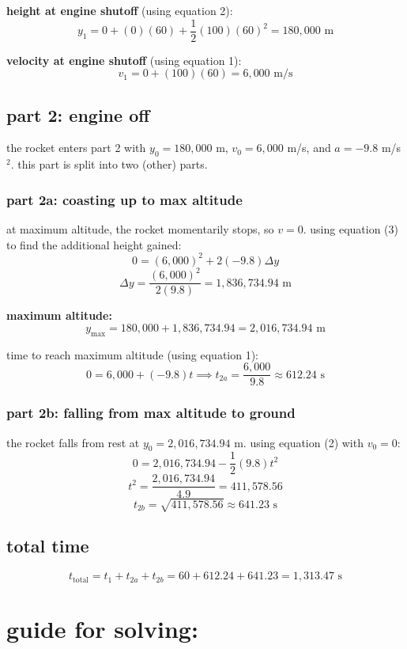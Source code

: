 \documentclass[12pt]{article}
\begin{document}
\textbf{height at engine shutoff} (using equation 2):
\[
y_1 = 0 + (0)(60) + \frac{1}{2}(100)(60)^2 = 180{,}000 \text{ m}
\]

\textbf{velocity at engine shutoff} (using equation 1):
\[
v_1 = 0 + (100)(60) = 6{,}000 \text{ m/s}
\]

\subsection*{part 2: engine off}

the rocket enters part 2 with $y_0 = 180{,}000$ m, $v_0 = 6{,}000$ m/s, and $a = -9.8$ m/s$^2$.
this part is split into two (other) parts.

\subsubsection*{part 2a: coasting up to max altitude}

at maximum altitude, the rocket momentarily stops, so $v = 0$. using equation (3) to find the
additional height gained:
\[
0 = (6{,}000)^2 + 2(-9.8)\Delta y
\]
\[
\Delta y = \frac{(6{,}000)^2}{2(9.8)} = 1{,}836{,}734.94 \text{ m}
\]

\textbf{maximum altitude:}
\[
y_{\max} = 180{,}000 + 1{,}836{,}734.94 = \boxed{2{,}016{,}734.94 \text{ m}}
\]

time to reach maximum altitude (using equation 1):
\[
0 = 6{,}000 + (-9.8)t \implies t_{2a} = \frac{6{,}000}{9.8} \approx 612.24 \text{ s}
\]

\subsubsection*{part 2b: falling from max altitude to ground}
the rocket falls from rest at $y_0 = 2{,}016{,}734.94$ m. using equation (2) with $v_0 = 0$:
\[
0 = 2{,}016{,}734.94 - \frac{1}{2}(9.8)t^2
\]
\[
t^2 = \frac{2{,}016{,}734.94}{4.9} = 411{,}578.56
\]
\[
t_{2b} = \sqrt{411{,}578.56} \approx 641.23 \text{ s}
\]

\subsection*{total time}

\[
t_{\text{total}} = t_1 + t_{2a} + t_{2b} = 60 + 612.24 + 641.23 = \boxed{1{,}313.47 \text{ s}}
\]

\section*{guide for solving:}
\end{document}
